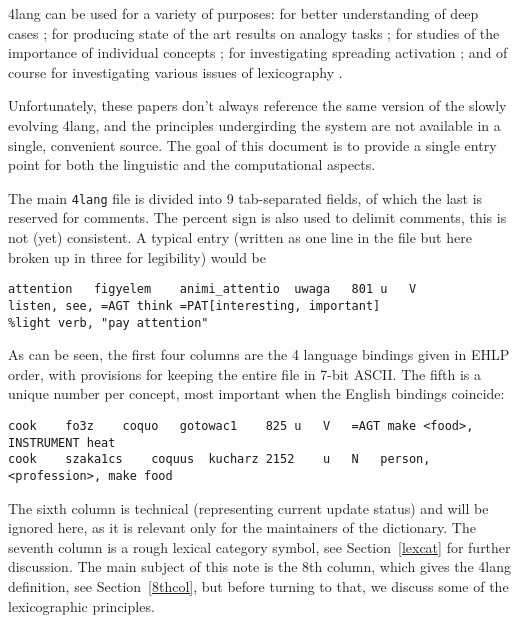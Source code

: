 \documentclass[11pt,bookmarks,bookmarksnumbered,naturalnames,plainpages=false,pdftex,colorlinks=true,urlcolor=blue,bookmarksdepth=subsection,plainpages=false]{paper}
\begin{document}
4lang can be used for a variety of purposes: for better understanding of
deep cases \citep{Makrai:2014}; for producing state of the art results on
analogy tasks \citep{Recski:2016c}; for studies of the importance of
individual concepts \citep{Makrai:2013a}; for investigating spreading
activation \citep{Nemeskey:2013}; and of course for investigating various
issues of lexicography \citep{Kornai:2015a}.

Unfortunately, these papers don't always reference the same version of the
slowly evolving 4lang, and the principles undergirding the system are not
available in a single, convenient source. The goal of this document is to
provide a single entry point for both the linguistic and the computational
aspects. 

The main {\tt 4lang} file is divided into 9 tab-separated fields, of which the
last is reserved for comments. The percent sign is also used to delimit
comments, this is not (yet) consistent. A typical entry (written as one line
in the file but here broken up in three for legibility) would be

\begin{verbatim}
attention	figyelem	animi_attentio	uwaga	801	u	V    
listen, see, =AGT think =PAT[interesting, important] 
%light verb, "pay attention"
\end{verbatim}

\noindent
As can be seen, the first four columns are the 4 language bindings given in
EHLP order, with provisions for keeping the entire file in 7-bit ASCII. The
fifth is a unique number per concept, most important when the English bindings
coincide: 

\begin{verbatim}
cook	fo3z	coquo	gotowac1	825	u	V	=AGT make <food>, INSTRUMENT heat	
cook	szaka1cs	coquus	kucharz	2152	u	N	person, <profession>, make food		
\end{verbatim}

\noindent
The sixth column is technical (representing current update status) and will be
ignored here, as it is relevant only for the maintainers of the
dictionary. The seventh column is a rough lexical category symbol, see
Section~\ref{lexcat} for further discussion. The main subject of this note is
the 8th column, which gives the 4lang definition, see Section~\ref{8thcol}, 
but before turning to that, we discuss some of the lexicographic
principles. 


\end{document}
